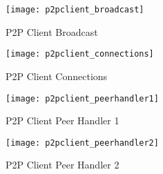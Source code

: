 \begin{figure}[!h]
  \centering
  \texttt{[image: p2pclient\_broadcast]}
  \caption{P2P Client Broadcast}
  \label{fig:p2pclient_broadcast}
\end{figure}

\begin{figure}[!h]
  \centering
  \texttt{[image: p2pclient\_connections]}
  \caption{P2P Client Connections}
  \label{fig:p2pclient_connections}
\end{figure}

\begin{figure}[!h]
  \centering
  \texttt{[image: p2pclient\_peerhandler1]}
  \caption{P2P Client Peer Handler 1}
  \label{fig:p2pclient_peerhandler1}
\end{figure}

\begin{figure}[!h]
  \centering
  \texttt{[image: p2pclient\_peerhandler2]}
  \caption{P2P Client Peer Handler 2}
  \label{fig:p2pclient_peerhandler2}
\end{figure}
